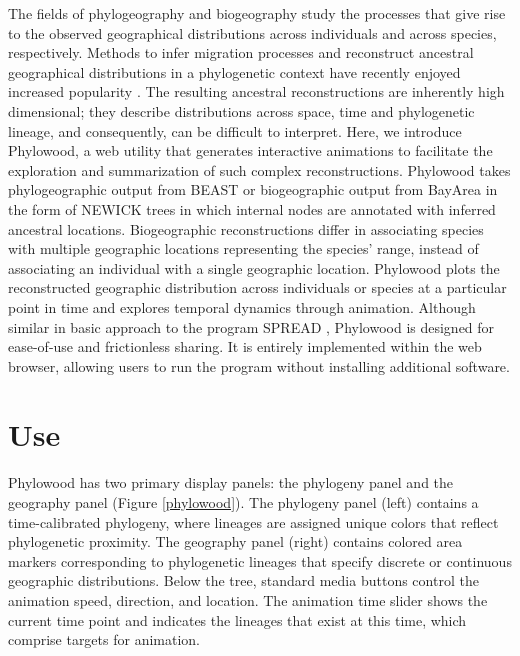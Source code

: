 \documentclass{bioinfo}
\begin{document}
The fields of phylogeography and biogeography study the processes that give rise to the observed geographical distributions across individuals and across species, respectively. Methods to infer migration processes and reconstruct ancestral geographical distributions in a phylogenetic context have recently enjoyed increased popularity \citep{ree08, lemey09, yu10, landis13}. The resulting ancestral reconstructions are inherently high dimensional; they describe distributions across space, time and phylogenetic lineage, and consequently, can be difficult to interpret. Here, we introduce Phylowood, a web utility that generates interactive animations to facilitate the exploration and summarization of such complex reconstructions.
Phylowood takes phylogeographic output from BEAST \citep{drummond12} or biogeographic output from BayArea \citep{landis13} in the form of NEWICK trees in which internal nodes are annotated with inferred ancestral locations. Biogeographic reconstructions differ in associating species with multiple geographic locations representing the species' range, instead of associating an individual with a single geographic location. Phylowood plots the reconstructed geographic distribution across individuals or species at a particular point in time and explores temporal dynamics through animation.
Although similar in basic approach to the program SPREAD \citep{bielejec11}, Phylowood is designed for ease-of-use and frictionless sharing.
It is entirely implemented within the web browser, allowing users to run the program without installing additional software.

\section{Use}

Phylowood has two primary display panels: the phylogeny panel and the geography panel (Figure \ref{phylowood}). The phylogeny panel (left) contains a time-calibrated phylogeny, where lineages are assigned unique colors that reflect phylogenetic proximity. The geography panel (right) contains colored area markers corresponding to phylogenetic lineages that specify discrete or continuous geographic distributions. Below the tree, standard media buttons control the animation speed, direction, and location. The animation time slider shows the current time point and indicates the lineages that exist at this time, which comprise targets for animation.
\end{document}
